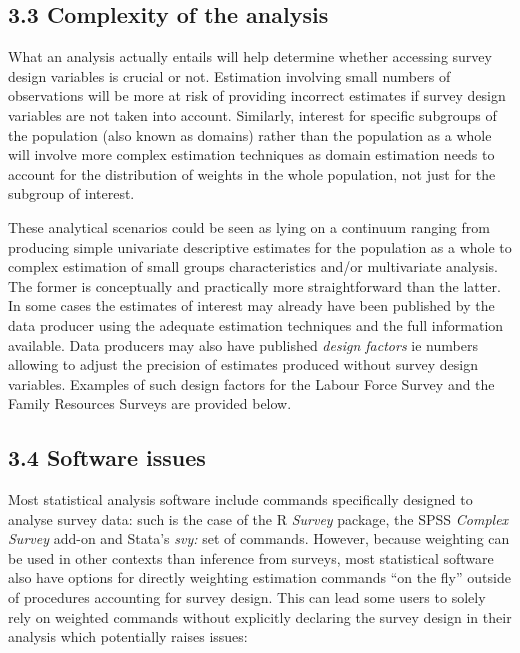 \documentclass[
  14,
  a4paper,
  DIV=11,
  numbers=noendperiod]{scrartcl}
\begin{document}
\hypertarget{complexity-of-the-analysis}{%
\subsection{3.3 Complexity of the
analysis}\label{complexity-of-the-analysis}}

What an analysis actually entails will help determine whether accessing
survey design variables is crucial or not. Estimation involving small
numbers of observations will be more at risk of providing incorrect
estimates if survey design variables are not taken into account.
Similarly, interest for specific subgroups of the population (also known
as domains) rather than the population as a whole will involve more
complex estimation techniques as domain estimation needs to account for
the distribution of weights in the whole population, not just for the
subgroup of interest.

These analytical scenarios could be seen as lying on a continuum ranging
from producing simple univariate descriptive estimates for the
population as a whole to complex estimation of small groups
characteristics and/or multivariate analysis. The former is conceptually
and practically more straightforward than the latter. In some cases the
estimates of interest may already have been published by the data
producer using the adequate estimation techniques and the full
information available. Data producers may also have published
\emph{design factors} ie numbers allowing to adjust the precision of
estimates produced without survey design variables. Examples of such
design factors for the Labour Force Survey and the Family Resources
Surveys are provided below.

\hypertarget{software-issues}{%
\subsection{3.4 Software issues}\label{software-issues}}

Most statistical analysis software include commands specifically
designed to analyse survey data: such is the case of the R \emph{Survey}
package, the SPSS \emph{Complex Survey} add-on and Stata's \emph{svy:}
set of commands. However, because weighting can be used in other
contexts than inference from surveys, most statistical software also
have options for directly weighting estimation commands ``on the fly''
outside of procedures accounting for survey design. This can lead some
users to solely rely on weighted commands without explicitly declaring
the survey design in their analysis which potentially raises issues:
\end{document}
